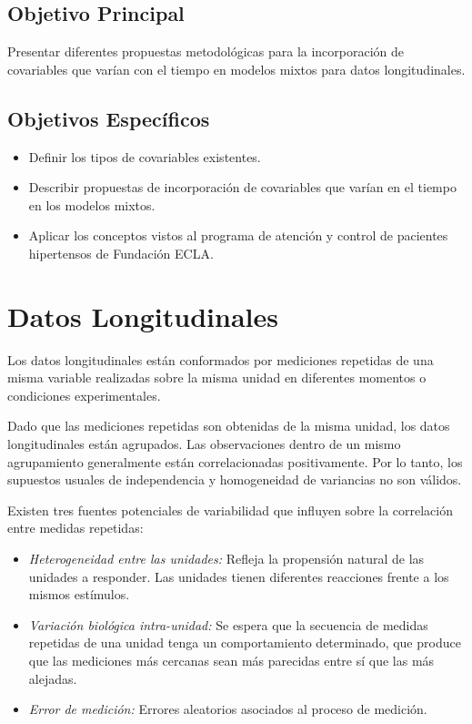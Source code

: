 \documentclass[spanish]{article}
\numberwithin{figure}{subsection}
\numberwithin{equation}{subsection}
\numberwithin{table}{subsection}
\begin{document}
\subsection{Objetivo Principal}

Presentar diferentes propuestas metodológicas para la incorporación de
covariables que varían con el tiempo en modelos mixtos para datos
longitudinales.

\subsection{Objetivos Específicos}

\begin{itemize}
	\item Definir los tipos de covariables existentes.
	\item Describir propuestas de incorporación de covariables que varían en el
	tiempo en los modelos mixtos.
	\item Aplicar los conceptos vistos al programa de
	atención y control de pacientes hipertensos de Fundación ECLA.
\end{itemize}

\newpage
\section{Datos Longitudinales}

Los datos longitudinales están conformados por mediciones repetidas de una misma
variable realizadas sobre la misma unidad en diferentes momentos o condiciones
experimentales.

Dado que las mediciones repetidas son obtenidas de la misma unidad, los datos
longitudinales están agrupados. Las observaciones dentro de un mismo
agrupamiento generalmente están correlacionadas positivamente. Por lo tanto, los
supuestos usuales de independencia y homogeneidad de variancias no son válidos.

Existen tres fuentes potenciales de variabilidad que influyen sobre la
correlación entre medidas repetidas:

\begin{itemize}
	\item \textit{Heterogeneidad entre las unidades:} Refleja la propensión
	natural de las unidades a responder. Las unidades tienen diferentes
	reacciones frente a los mismos estímulos.
	\item \textit{Variación biológica intra-unidad:} Se espera que la secuencia
	de medidas repetidas de una unidad tenga un comportamiento determinado, que
	produce que las mediciones más cercanas sean más parecidas entre sí que las
	más alejadas.
	\item \textit{Error de medición:} Errores aleatorios asociados al proceso de
	medición.
\end{itemize}
\end{document}
